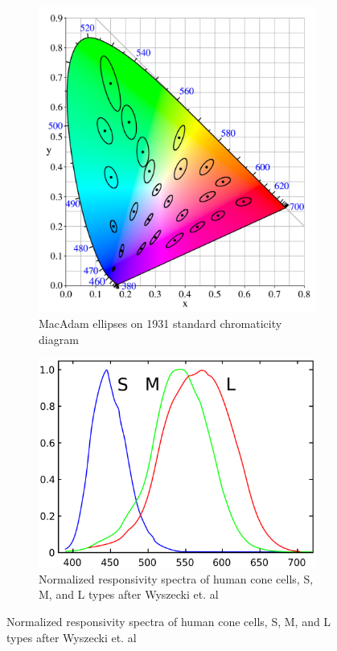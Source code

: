 \begin{figure}[htbp]
	\label{fig:greenscreen:stimula}
	\begin{subfigure}[t]{.35\textwidth}
		\centering
		\includegraphics[width=\textwidth]{_external/media/CIExy1931_MacAdam.png}
	\caption{MacAdam ellipses on 1931 standard chromaticity diagram 
		\cite{wiki:macadam:2017}}
	\end{subfigure}
	\begin{subfigure}[t]{.5\textwidth}
		\centering
		\includegraphics[width=\textwidth]{_external/media/1280px-Cones_SMJ2_E.png}
		\caption{Normalized responsivity spectra of human cone cells, S, M, and 
		L types after Wyszecki et. al \cite{wiki:Wyszecki:2017}}
	\end{subfigure}
\end{figure}

